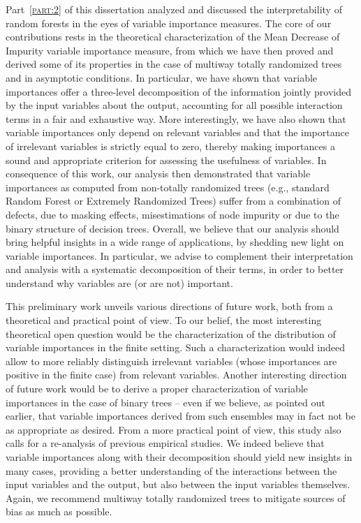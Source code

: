 Part~\textsc{\ref{part:2}} of this dissertation analyzed and discussed the
interpretability of random forests in the eyes of variable importance measures.
The core of our contributions rests in the theoretical characterization of the
Mean Decrease of Impurity variable importance measure, from which we have then
proved and derived some of its properties in the case of multiway totally
randomized trees and in asymptotic conditions. In particular, we have shown
that variable importances offer a three-level decomposition of the information
jointly provided by the input variables about the output, accounting for all
possible interaction terms in a fair and exhaustive way. More interestingly, we
have also shown that variable importances only depend on relevant variables and
that the importance of irrelevant variables is strictly equal to zero, thereby
making importances a sound and appropriate criterion for assessing the
usefulness of variables. In consequence of this work, our analysis then
demonstrated that variable importances as computed from non-totally randomized
trees (e.g., standard Random Forest or Extremely Randomized Trees) suffer from
a combination of defects, due to masking effects, misestimations of node
impurity or due to the binary structure of decision trees. Overall, we believe
that our analysis should bring helpful insights in a wide range of
applications, by shedding new light on variable importances. In particular, we
advise to complement their interpretation and analysis with a systematic
decomposition of their terms, in order to better understand why variables are
(or are not) important.

This preliminary work unveils various directions of future work, both from a
theoretical and practical point of view. To our belief, the most interesting
theoretical open question would be the characterization of the distribution of
variable importances in the finite setting. Such a characterization would
indeed allow to more reliably distinguish irrelevant variables (whose
importances are positive in the finite case) from relevant variables. Another
interesting direction of future work would be to derive a proper
characterization of variable importances in the case of binary trees -- even if we
believe, as pointed out earlier, that variable importances derived from such
ensembles may in fact not be as appropriate as desired. From a more practical
point of view, this study also calls for a re-analysis of previous empirical
studies. We indeed believe that variable importances along with their
decomposition should yield new insights in many cases, providing a better
understanding of the interactions between the input variables and the output,
but also between the input variables themselves. Again, we recommend multiway
totally randomized trees to mitigate sources of bias as much as possible.

